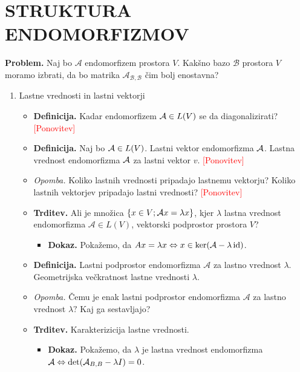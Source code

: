 \section{STRUKTURA ENDOMORFIZMOV}

\textbf{Problem.} Naj bo $\mathcal{A}$ endomorfizem prostora $V$. Kakšno bazo $\mathcal{B}$ prostora $V$ moramo izbrati, da bo matrika $\mathcal{A}_{\mathcal{B},\mathcal{B}}$ čim bolj enostavna?

\begin{enumerate}

    \item Lastne vrednosti in lastni vektorji
    \begin{itemize}
        \item \colorbox{purple!30}{\textbf{Definicija.}} Kadar endomorfizem $\mathcal{A} \in L(V)$ se da diagonalizirati? \textcolor{red}{[Ponovitev]}
        \item \colorbox{purple!30}{\textbf{Definicija.}} Naj bo $\mathcal{A} \in L(V)$. Lastni vektor endomorfizma $\mathcal{A}$. Lastna vrednost endomorfizma $\mathcal{A}$ za lastni vektor $v$. \textcolor{red}{[Ponovitev]}
        \item \colorbox{yellow!30}{\emph{Opomba.}} Koliko lastnih vrednosti pripadajo lastnemu vektorju? Koliko lastnih vektorjev pripadajo lastni vrednosti? \textcolor{red}{[Ponovitev]}
        \item \colorbox{blue!30}{\textbf{Trditev.}} Ali je množica $\left\{x \in V; \mathcal{A} x = \lambda x\right\}$, kjer $\lambda$ lastna vrednost endomorfizma $\mathcal{A} \in L(V)$, vektorski podprostor prostora $V$?
        \begin{itemize}
            \item \colorbox{green!30}{\textbf{Dokaz.}} Pokažemo, da $Ax = \lambda x \Leftrightarrow x \in \ker (\mathcal{A} - \lambda \operatorname{id})$.
        \end{itemize}
        \item \colorbox{purple!30}{\textbf{Definicija.}} Lastni podprostor endomorfizma $\mathcal{A}$ za lastno vrednost $\lambda$. Geometrijska večkratnost lastne vrednosti $\lambda$.
        \item \colorbox{yellow!30}{\emph{Opomba.}} Čemu je enak lastni podprostor endomorfizma $\mathcal{A}$ za lastno vrednost $\lambda?$ Kaj ga sestavljajo?
        \item \colorbox{blue!30}{\textbf{Trditev.}} Karakterizicija lastne vrednosti.
        \begin{itemize}
            \item \colorbox{green!30}{\textbf{Dokaz.}} Pokažemo, da $\lambda$ je lastna vrednost endomorfizma $\mathcal{A} \Leftrightarrow \det (\mathcal{A}_{B,B} - \lambda I) = 0$.

\end{itemize}
\end{itemize}
\end{enumerate}
